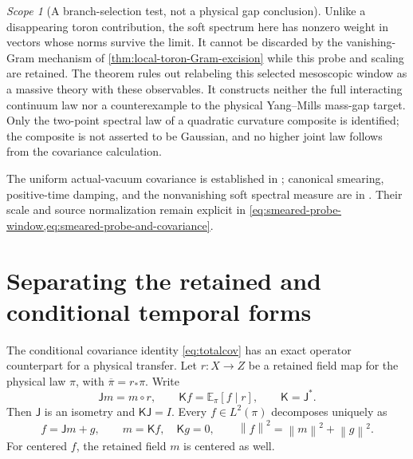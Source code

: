 \documentclass[11pt,oneside,openany]{book}
\theoremstyle{definition}
\theoremstyle{remark}
\newtheorem{scope}[scope]{Scope}
\newcommand{\E}{\mathbb E}
\newcommand{\norm}[1]{\left\lVert#1\right\rVert}
\newcommand{\src}[2]{\cite[#2]{#1}}
\newcommand{\sourcebasis}[1]{\par\smallskip\noindent #1\par}
\begin{document}
\begin{scope}[A branch-selection test, not a physical gap conclusion]
Unlike a disappearing toron contribution, the soft spectrum here
has nonzero weight in vectors whose norms survive the limit. It
cannot be discarded by the vanishing-Gram mechanism of
\cref{thm:local-toron-Gram-excision} while this probe and scaling
are retained. The theorem rules out relabeling this selected
mesoscopic window as a massive theory with these observables.
It constructs neither the full interacting continuum law nor a
counterexample to the physical Yang--Mills mass-gap target.
Only the two-point spectral law of a quadratic curvature composite
is identified; the composite is not asserted to be Gaussian, and
no higher joint law follows from the covariance calculation.
\end{scope}
\sourcebasis{The uniform actual-vacuum covariance is established
in \src{F15}{V64}; canonical smearing, positive-time damping,
and the nonvanishing soft spectral measure are in
\src{F15}{V65}. Their scale and source normalization remain
explicit in \cref{eq:smeared-probe-window,eq:smeared-probe-and-covariance}.}


\section{Separating the retained and conditional temporal forms}
\label{sec:two-level-transfer}
The conditional covariance identity \cref{eq:totalcov} has an exact
operator counterpart for a physical transfer. Let $r:X\to Z$ be a
retained field map for the physical law $\pi$, with
$\overline\pi=r_*\pi$. Write
\[
\mathsf Jm=m\circ r,\qquad
\mathsf Kf=\E_\pi[f\mid r],\qquad \mathsf K=\mathsf J^*.
\]
Then $\mathsf J$ is an isometry and $\mathsf K\mathsf J=I$. Every
$f\in L^2(\pi)$ decomposes uniquely as
\begin{equation}\label{eq:two-level-decomposition}
f=\mathsf Jm+g,\qquad m=\mathsf Kf,\quad \mathsf Kg=0,
\qquad \norm f^2=\norm m^2+\norm g^2.
\end{equation}
For centered $f$, the retained field $m$ is centered as well.
\end{document}
